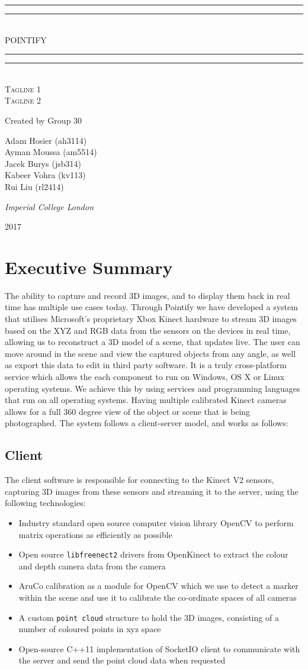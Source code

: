 \documentclass{article}
\newcommand*{\titleGP}{\begingroup %
\centering %
\vspace*{\baselineskip} %

\rule{\textwidth}{1.6pt}\vspace*{-\baselineskip}\vspace*{2pt} %
\rule{\textwidth}{0.4pt}\\[\baselineskip] %

{\LARGE POINTIFY}\\[0.2\baselineskip] %

\rule{\textwidth}{0.4pt}\vspace*{-\baselineskip}\vspace{3.2pt} %
\rule{\textwidth}{1.6pt}\\[\baselineskip] %

\scshape %
Tagline 1 \\ 
Tagline 2\par

\vspace*{2\baselineskip}

Created by Group 30\\[\baselineskip]
{\Large Adam Hosier (ah3114)\\ Ayman Moussa (am5514) \\Jacek Burys (jsb314) \\Kabeer Vohra (kv113) \\ Rui Liu (rl2414) \\  \par} %

\vspace*{1\baselineskip}
{\itshape Imperial College London\par} %

\vfill 

{\scshape 2017} \\[0.3\baselineskip] %

\endgroup}
\begin{document}
 

\titleGP
\thispagestyle{empty}

\newpage
\setcounter{page}{1}
\tableofcontents

\newpage
\section{Executive Summary}
The ability to capture and record 3D images, and to display them back in real time has multiple use cases today. Through Pointify we have developed a system that utilises Microsoft's proprietary Xbox Kinect hardware to stream 3D images based on the XYZ and RGB data from the sensors on the devices in real time, allowing us to reconstruct a 3D model of a scene, that updates live. The user can move around in the scene and view the captured objects from any angle, as well as export this data to edit in third party software. It is a truly cross-platform service which allows the each component to run on Windows, OS X or Linux operating systems. We achieve this by using services and programming languages that run on all operating systems. Having multiple calibrated Kinect cameras allows for a full 360 degree view of the object or scene that is being photographed. The system follows a client-server model, and works as follows:
\subsection{Client}
The client software is responsible for connecting to the Kinect V2 sensors, capturing 3D images from these sensors and streaming it to the server, using the following technologies:
\begin{itemize}
\item Industry standard open source computer vision library OpenCV to perform matrix operations as efficiently as possible
\item Open source \texttt{libfreenect2} drivers from OpenKinect to extract the colour and depth camera data from the camera
\item AruCo calibration as a module for OpenCV which we use to detect a marker within the scene and use it to calibrate the co-ordinate spaces of all cameras
\item A custom \texttt{point cloud} structure to hold the 3D images, consisting of a number of coloured points in xyz space
\item Open-source C++11 implementation of SocketIO client to communicate with the server and send the point cloud data when requested
\end{itemize}
\end{document}

